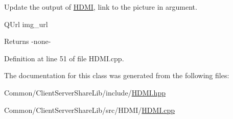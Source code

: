 Update the output of \hyperlink{classbb_1_1_e_m2015_1_1_h_d_m_i}{H\+D\+M\+I}, link to the picture in argument.

\begin{DoxyItemize}
\item Q\+Url img\+\_\+url \begin{DoxyReturn}{Returns}
-\/none-\/ 
\end{DoxyReturn}
\end{DoxyItemize}


Definition at line 51 of file H\+D\+M\+I.\+cpp.



The documentation for this class was generated from the following files\+:\begin{DoxyCompactItemize}
\item 
Common/\+Client\+Server\+Share\+Lib/include/\hyperlink{_h_d_m_i_8hpp}{H\+D\+M\+I.\+hpp}\item 
Common/\+Client\+Server\+Share\+Lib/src/\+H\+D\+M\+I/\hyperlink{_h_d_m_i_8cpp}{H\+D\+M\+I.\+cpp}\end{DoxyCompactItemize}
